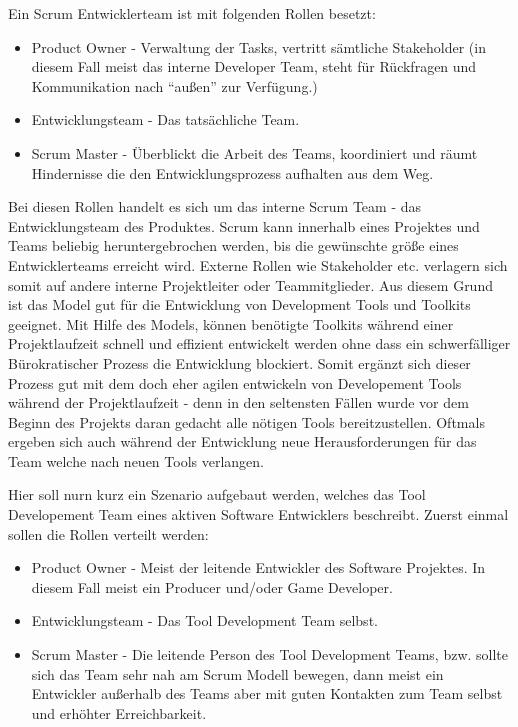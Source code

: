 \documentclass[pagesize, paper=a4, fontsize=12pt,titlepage=true, headings=small, headnosepline, abstractoff, liststotoc, nochapterprefix, plainheadsepline, twoside]{scrreprt}
\begin{document}
Ein Scrum Entwicklerteam ist mit folgenden Rollen besetzt:
\begin{itemize}
\item Product Owner - Verwaltung der Tasks, vertritt sämtliche Stakeholder (in diesem Fall meist das interne Developer Team, steht für Rückfragen und Kommunikation nach “außen” zur Verfügung.)
\item Entwicklungsteam - Das tatsächliche Team.
\item Scrum Master - Überblickt die Arbeit des Teams, koordiniert und räumt Hindernisse die den Entwicklungsprozess aufhalten aus dem Weg.
\end{itemize}

Bei diesen Rollen handelt es sich um das interne Scrum Team - das Entwicklungsteam des Produktes. Scrum kann innerhalb eines Projektes und Teams beliebig heruntergebrochen werden, bis die gewünschte größe eines Entwicklerteams erreicht wird. Externe Rollen wie Stakeholder etc. verlagern sich somit auf andere interne Projektleiter oder Teammitglieder. Aus diesem Grund ist das Model gut für die Entwicklung von Development Tools und Toolkits geeignet. Mit Hilfe des Models, können benötigte Toolkits während einer Projektlaufzeit schnell und effizient entwickelt werden ohne dass ein schwerfälliger Bürokratischer Prozess die Entwicklung blockiert. Somit ergänzt sich dieser Prozess gut mit dem doch eher agilen entwickeln von Developement Tools während der Projektlaufzeit - denn in den seltensten Fällen wurde vor dem Beginn des Projekts daran gedacht alle nötigen Tools bereitzustellen. Oftmals ergeben sich auch während der Entwicklung neue Herausforderungen für das Team welche nach neuen Tools verlangen.

Hier soll nurn kurz ein Szenario aufgebaut werden, welches das Tool Developement Team eines aktiven Software Entwicklers beschreibt. Zuerst einmal sollen die Rollen verteilt werden:

\begin{itemize}
\item Product Owner - Meist der leitende Entwickler des Software Projektes. In diesem Fall meist ein Producer und/oder Game Developer.
\item Entwicklungsteam - Das Tool Development Team selbst.
\item Scrum Master - Die leitende Person des Tool Development Teams, bzw. sollte sich das Team sehr nah am Scrum Modell bewegen, dann meist ein Entwickler außerhalb des Teams aber mit guten Kontakten zum Team selbst und erhöhter Erreichbarkeit.
\end{itemize}
\end{document}
